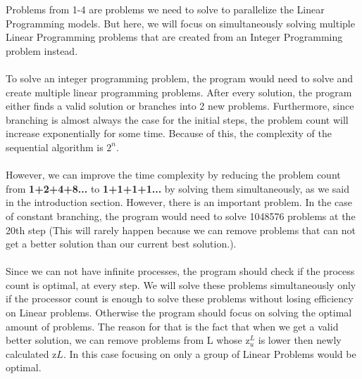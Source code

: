 Problems from 1-4 are problems we need to solve to parallelize the Linear Programming models. But here, we will focus on simultaneously solving multiple Linear Programming problems that are created from an Integer Programming problem instead.\\
\\
To solve an integer programming problem, the program would need to solve and create multiple linear programming problems. After every solution, the program either finds a valid solution or branches into 2 new problems. Furthermore, since branching is almost always the case for the initial steps, the problem count will increase exponentially for some time. Because of this, the complexity of the sequential algorithm is $2^n$.\\
\\
However, we can improve the time complexity by reducing the problem count from \textbf{1+2+4+8...} to \textbf{1+1+1+1...} by solving them simultaneously, as we said in the introduction section. However, there is an important problem. In the case of constant branching, the program would need to solve 1048576 problems at the 20th step (This will rarely happen because we can remove problems that can not get a better solution than our current best solution.). \\
\\
Since we can not have infinite processes, the program should check if the process count is optimal, at every step. We will solve these problems simultaneously only if the processor count is enough to solve these problems without losing efficiency on Linear problems. Otherwise the program should focus on solving the optimal amount of problems. The reason for that is the fact that when we get a valid better solution, we can remove problems from L whose z$_u^L$ is lower then newly calculated z$L$. In this case focusing on only a group of Linear Problems would be optimal.